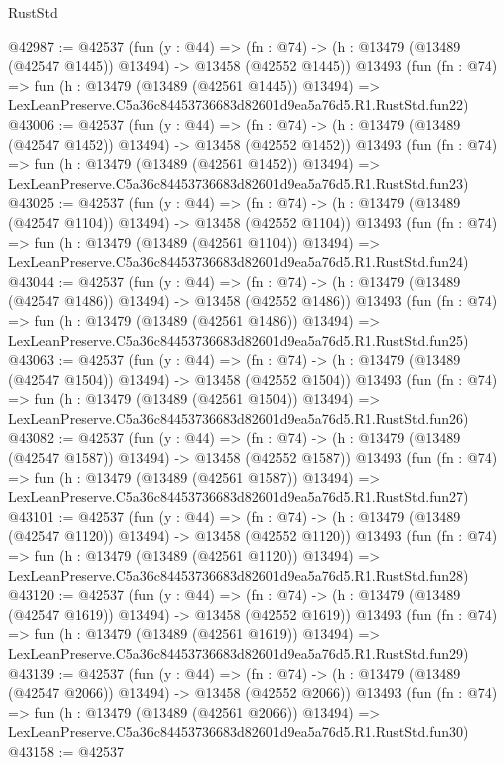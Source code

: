 \begin{lexlean}{RustStd}
\begin{coremodule}
@42987 := @42537
    (fun (y : @44) =>
    (fn : @74) -> (h : @13479 (@13489 (@42547 @1445)) @13494) -> @13458 (@42552 @1445))
    @13493
    (fun (fn : @74) =>
    fun (h : @13479 (@13489 (@42561 @1445)) @13494) =>
    LexLeanPreserve.C5a36c84453736683d82601d9ea5a76d5.R1.RustStd.fun22)
@43006 := @42537
    (fun (y : @44) =>
    (fn : @74) -> (h : @13479 (@13489 (@42547 @1452)) @13494) -> @13458 (@42552 @1452))
    @13493
    (fun (fn : @74) =>
    fun (h : @13479 (@13489 (@42561 @1452)) @13494) =>
    LexLeanPreserve.C5a36c84453736683d82601d9ea5a76d5.R1.RustStd.fun23)
@43025 := @42537
    (fun (y : @44) =>
    (fn : @74) -> (h : @13479 (@13489 (@42547 @1104)) @13494) -> @13458 (@42552 @1104))
    @13493
    (fun (fn : @74) =>
    fun (h : @13479 (@13489 (@42561 @1104)) @13494) =>
    LexLeanPreserve.C5a36c84453736683d82601d9ea5a76d5.R1.RustStd.fun24)
@43044 := @42537
    (fun (y : @44) =>
    (fn : @74) -> (h : @13479 (@13489 (@42547 @1486)) @13494) -> @13458 (@42552 @1486))
    @13493
    (fun (fn : @74) =>
    fun (h : @13479 (@13489 (@42561 @1486)) @13494) =>
    LexLeanPreserve.C5a36c84453736683d82601d9ea5a76d5.R1.RustStd.fun25)
@43063 := @42537
    (fun (y : @44) =>
    (fn : @74) -> (h : @13479 (@13489 (@42547 @1504)) @13494) -> @13458 (@42552 @1504))
    @13493
    (fun (fn : @74) =>
    fun (h : @13479 (@13489 (@42561 @1504)) @13494) =>
    LexLeanPreserve.C5a36c84453736683d82601d9ea5a76d5.R1.RustStd.fun26)
@43082 := @42537
    (fun (y : @44) =>
    (fn : @74) -> (h : @13479 (@13489 (@42547 @1587)) @13494) -> @13458 (@42552 @1587))
    @13493
    (fun (fn : @74) =>
    fun (h : @13479 (@13489 (@42561 @1587)) @13494) =>
    LexLeanPreserve.C5a36c84453736683d82601d9ea5a76d5.R1.RustStd.fun27)
@43101 := @42537
    (fun (y : @44) =>
    (fn : @74) -> (h : @13479 (@13489 (@42547 @1120)) @13494) -> @13458 (@42552 @1120))
    @13493
    (fun (fn : @74) =>
    fun (h : @13479 (@13489 (@42561 @1120)) @13494) =>
    LexLeanPreserve.C5a36c84453736683d82601d9ea5a76d5.R1.RustStd.fun28)
@43120 := @42537
    (fun (y : @44) =>
    (fn : @74) -> (h : @13479 (@13489 (@42547 @1619)) @13494) -> @13458 (@42552 @1619))
    @13493
    (fun (fn : @74) =>
    fun (h : @13479 (@13489 (@42561 @1619)) @13494) =>
    LexLeanPreserve.C5a36c84453736683d82601d9ea5a76d5.R1.RustStd.fun29)
@43139 := @42537
    (fun (y : @44) =>
    (fn : @74) -> (h : @13479 (@13489 (@42547 @2066)) @13494) -> @13458 (@42552 @2066))
    @13493
    (fun (fn : @74) =>
    fun (h : @13479 (@13489 (@42561 @2066)) @13494) =>
    LexLeanPreserve.C5a36c84453736683d82601d9ea5a76d5.R1.RustStd.fun30)
@43158 := @42537

\end{coremodule}
\end{lexlean}
